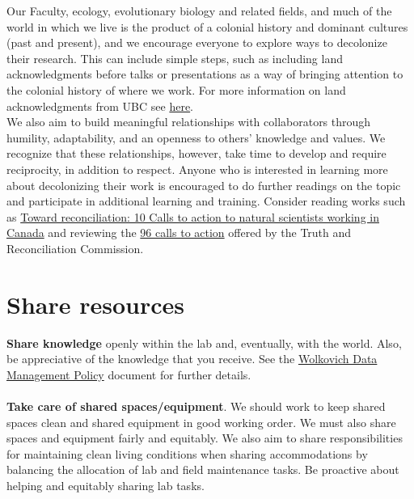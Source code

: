 \documentclass[11pt,a4paper,oneside]{article}
\begin{document}
Our Faculty, ecology, evolutionary biology and related fields, and much of the world in which we live is the product of a colonial history and dominant cultures (past and present), and we encourage everyone to explore ways to decolonize their research. This can include simple steps, such as including land acknowledgments before talks or presentations as a way of bringing attention to the colonial history of where we work. For more information on land acknowledgments from UBC see \href{https://vpfo.ubc.ca/news/what-is-a-land-acknowledgement/}{here}. \\ %

\noindent We also aim to build meaningful relationships with collaborators through humility, adaptability, and an openness to others' knowledge and values. We recognize that these relationships, however, take time to develop and require reciprocity, in addition to respect. Anyone who is interested in learning more about decolonizing their work is encouraged to do further readings on the topic and participate in additional learning and training. Consider reading works such as \href{https://www.facetsjournal.com/doi/10.1139/facets-2020-0005}{Toward reconciliation: 10 Calls to action to natural scientists working in Canada} and reviewing the \href{http://trc.ca/assets/pdf/Calls_to_Action_English2.pdf}{96 calls to action} offered by the Truth and Reconciliation Commission.

\section{Share resources}

\textbf{Share knowledge} openly within the lab and, eventually, with the world. Also, be appreciative of the knowledge that you receive. See the \href{https://github.com/temporalecologylab/labgit/blob/master/datacodemgmt/tempeco_DMP.pdf}{Wolkovich Data Management Policy} document for further details.\\
\\
\noindent
\textbf{Take care of shared spaces/equipment}. We should work to keep shared spaces clean and shared equipment in good working order. We must also share spaces and equipment fairly and equitably. We also aim to share responsibilities for maintaining clean living conditions when sharing accommodations by balancing the allocation of lab and field maintenance tasks. Be proactive about helping and equitably sharing lab tasks. 
\end{document}
